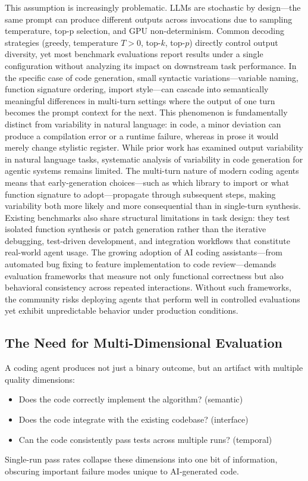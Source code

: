 \documentclass[conference]{IEEEtran}
\begin{document}
This assumption is increasingly problematic.
LLMs are stochastic by design---the same prompt can produce different outputs across invocations due to sampling temperature, top-p selection, and GPU non-determinism.
Common decoding strategies (greedy, temperature $T > 0$, top-$k$, top-$p$) directly control output diversity, yet most benchmark evaluations report results under a single configuration without analyzing its impact on downstream task performance.
In the specific case of code generation, small syntactic variations---variable naming, function signature ordering, import style---can cascade into semantically meaningful differences in multi-turn settings where the output of one turn becomes the prompt context for the next.
This phenomenon is fundamentally distinct from variability in natural language: in code, a minor deviation can produce a compilation error or a runtime failure, whereas in prose it would merely change stylistic register.
While prior work has examined output variability in natural language tasks, systematic analysis of variability in code generation for agentic systems remains limited.
The multi-turn nature of modern coding agents means that early-generation choices---such as which library to import or what function signature to adopt---propagate through subsequent steps, making variability both more likely and more consequential than in single-turn synthesis.
Existing benchmarks also share structural limitations in task design: they test isolated function synthesis or patch generation rather than the iterative debugging, test-driven development, and integration workflows that constitute real-world agent usage.
The growing adoption of AI coding assistants---from automated bug fixing to feature implementation to code review---demands evaluation frameworks that measure not only functional correctness but also behavioral consistency across repeated interactions.
Without such frameworks, the community risks deploying agents that perform well in controlled evaluations yet exhibit unpredictable behavior under production conditions.

\subsection{The Need for Multi-Dimensional Evaluation}

A coding agent produces not just a binary outcome, but an artifact with multiple quality dimensions:
\begin{itemize}
\item Does the code correctly implement the algorithm? (semantic)
\item Does the code integrate with the existing codebase? (interface)
\item Can the code consistently pass tests across multiple runs? (temporal)
\end{itemize}
Single-run pass rates collapse these dimensions into one bit of information, obscuring important failure modes unique to AI-generated code.
\end{document}
